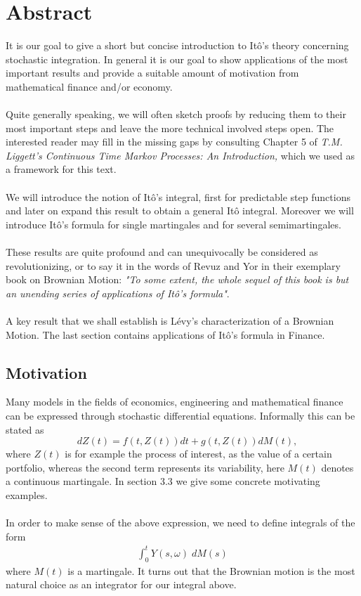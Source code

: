 \documentclass[11pt,a4paper, final]{article}
\begin{document}
\section{Abstract}
It is our goal to give a short but concise introduction to Itô's theory concerning stochastic integration. In general it is our goal to show applications of the most important results and provide a suitable amount of motivation from mathematical finance and/or economy. 
\\\\
Quite generally speaking, we will often sketch proofs by reducing them to their most important steps and leave the more technical involved steps open. The interested reader may fill in the missing gaps by consulting  Chapter 5 of \textit{T.M. Liggett's Continuous Time Markov Processes: An Introduction,} which we used as a framework for this text. 
\\\\
We will introduce the notion of Itô's integral, first for predictable step functions and later on expand this result to obtain a general Itô integral. Moreover we will introduce Itô's formula for single martingales and for several semimartingales.
\\\\
\noindent These results are quite profound and can unequivocally be considered as revolutionizing, or to say it in the words of Revuz and Yor in their exemplary book on Brownian Motion: \textit{"To some extent, the whole sequel of this book is but an unending series of applications of Itô's formula"}.
\\\\
A key result that we shall establish is Lévy's characterization of a Brownian Motion. The last section contains applications of Itô's formula in Finance. 
\subsection{Motivation}
\noindent Many models in the fields of economics, engineering and mathematical finance can be expressed through stochastic differential equations. Informally this can be stated as
$$ \quad dZ(t) = f(t, Z(t))dt + g(t,Z(t)) dM(t), $$
where $Z(t)$ is for example the process of interest, as the value of a certain portfolio, whereas the second term represents its variability, here $M(t)$ denotes a continuous martingale. In section 3.3 we give some concrete motivating examples. \\
\\
In order to make sense of the above expression, we need to define integrals of the form
\begin{align*} \int_0^t Y(s,\omega) \; dM(s) \tag{$\star$} 
\end{align*}
where $M(t)$ is a martingale. It turns out that the Brownian motion is the most natural choice as an integrator for our integral above. 
\newpage 
\end{document}
